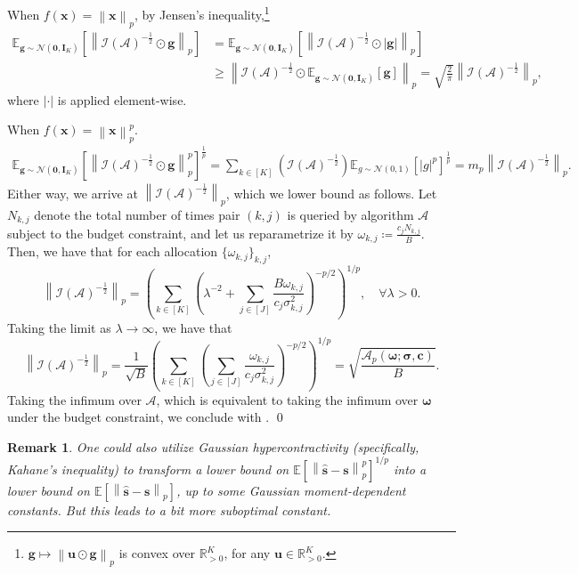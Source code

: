 \documentclass{article}
\def\vzero{{\bm{0}}}
\def\vc{{\bm{c}}}
\def\vg{{\bm{g}}}
\def\vs{{\bm{s}}}
\def\vu{{\bm{u}}}
\def\vx{{\bm{x}}}
\def\mI{{\bm{I}}}
\def\gA{{\mathcal{A}}}
\def\gI{{\mathcal{I}}}
\def\gN{{\mathcal{N}}}
\def\sR{{\mathbb{R}}}
\newcommand{\E}{\mathbb{E}}
\theoremstyle{plain}
\theoremstyle{definition}
\theoremstyle{plain}
\newtheorem{remark}{Remark}
\newcommand{\bignorm}[1]{\left\lVert #1 \right\rVert}
\begin{document}
When $f(\vx) = \bignorm{\vx}_p$, by Jensen's inequality,\footnote{$\vg \mapsto \bignorm{\vu \odot \vg}_p$ is convex over $\sR_{>0}^K$, for any $\vu \in \sR_{>0}^K$.}
\begin{align}
    \E_{\vg \sim \gN(\vzero, \mI_K)}\left[ \bignorm{ \gI(\gA)^{-\frac{1}{2}} \odot \vg}_p \right]
    &= \E_{\vg \sim \gN(\vzero, \mI_K)}\left[ \bignorm{ \gI(\gA)^{-\frac{1}{2}} \odot |\vg|}_p \right] \\
    &\geq \bignorm{ \gI(\gA)^{-\frac{1}{2}} \odot \E_{\vg \sim \gN(\vzero, \mI_K)}[\vg]}_p 
    = \sqrt{\frac{2}{\pi}} \bignorm{\gI(\gA)^{-\frac{1}{2}}}_p,
\end{align}
where $|\cdot|$ is applied element-wise.

When $f(\vx) = \bignorm{\vx}_p^p$.
\begin{align}
    \E_{\vg \sim \gN(\vzero, \mI_K)}\left[ \bignorm{ \gI(\gA)^{-\frac{1}{2}} \odot \vg}_p^p \right]^{\frac{1}{p}}
    = \sum_{k \in [K]} \left( \gI(\gA)^{-\frac{1}{2}} \right) \E_{g \sim \gN(0, 1)}[|g|^p]^{\frac{1}{p}}
    = m_p \bignorm{\gI(\gA)^{-\frac{1}{2}}}_p.
\end{align}
Either way, we arrive at $\bignorm{\gI(\gA)^{-\frac{1}{2}}}_p$, which we lower bound as follows.
Let \(N_{k,j}\) denote the total number of times pair \((k,j)\) is queried by algorithm $\gA$ subject to the budget constraint, and let us reparametrize it by $\omega_{k,j} \coloneq \frac{c_j N_{k,j}}{B}$.
Then, we have that for each allocation $\{\omega_{k,j}\}_{k,j}$,
\begin{equation}
    \bignorm{\gI(\gA)^{-\frac{1}{2}}}_p = \left( \sum_{k \in [K]} \left( \lambda^{-2} + \sum_{j \in [J]} \frac{B \omega_{k,j}}{c_j \sigma_{k,j}^2} \right)^{-p/2} \right)^{1/p}, \quad \forall \lambda > 0.
\end{equation}
Taking the limit as $\lambda \to \infty$, we have that
\begin{equation}
    \bignorm{\gI(\gA)^{-\frac{1}{2}}}_p = \frac{1}{\sqrt{B}} \left( \sum_{k \in [K]} \left( \sum_{j \in [J]} \frac{\omega_{k,j}}{c_j \sigma_{k,j}^2} \right)^{-p/2} \right)^{1/p}
    = \sqrt{\frac{\gA_p(\bm\omega; \bm\sigma, \vc)}{B}}.
\end{equation}
Taking the infimum over $\gA$, which is equivalent to taking the infimum over $\bm\omega$ under the budget constraint, we conclude with .
\qed

\begin{remark}
    One could also utilize Gaussian hypercontractivity (specifically, Kahane's inequality) to transform a lower bound on $\E\left[\bignorm{\hat{\vs} - \vs}_p^p\right]^{1/p}$ into a lower bound on $\E\left[\bignorm{\hat{\vs} - \vs}_p\right]$, up to some Gaussian moment-dependent constants.
    But this leads to a bit more suboptimal constant.
\end{remark}
\end{document}
